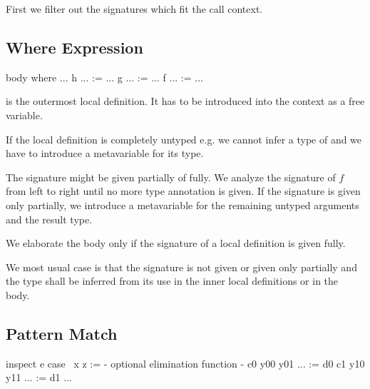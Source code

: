 First we filter out the signatures which fit the call context.



\subsection{Where Expression}

\begin{alba}
    body where
        ...
        h ... := ...
        g ... := ...
        f ... := ...
\end{alba}

 is the outermost local definition. It has to be introduced into the
context as a free variable.

If the local definition is completely untyped e.g.
 we cannot infer a type of  and we have to
introduce a metavariable for its type.

The signature might be given partially of fully. We analyze the signature of $f$
from left to right until no more type annotation is given. If the signature is
given only partially, we introduce a metavariable for the remaining untyped
arguments and the result type.

We elaborate the body only if the signature of a local definition is given
fully.

We most usual case is that the signature is not given or given only partially
and the type shall be inferred from its use in the inner local definitions or in
the body.





\subsection{Pattern Match}


\begin{alba}
    inspect e case
        {\ {x} z :=
            {- optional elimination function -}
        }
        c0 y00 y01 ... := d0
        c1 y10 y11 ... := d1
        ...
\end{alba}






